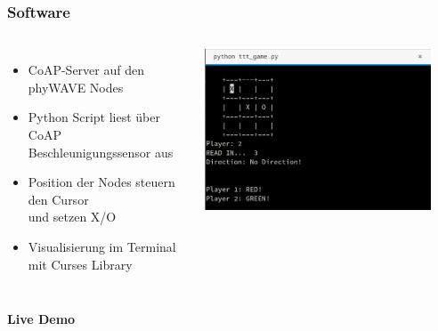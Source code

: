 \documentclass[aspectratio=169, 10pt]{beamer}
\begin{document}
    \begin{frame}
        \frametitle{Software}
        \begin{columns}
            \begin{itemize}
                \item CoAP-Server auf den phyWAVE Nodes
                \item Python Script liest über CoAP Beschleunigungssensor aus
                \item Position der Nodes steuern den Cursor\\und setzen X/O
                \item Visualisierung im Terminal\\mit Curses Library
            \end{itemize}
            \includegraphics[width=0.9\textwidth]{figs/game.png}
        \end{columns}
    \end{frame}

    \begin{frame}
        \centering
        \textbf{Live Demo}
    \end{frame}
\end{document}
